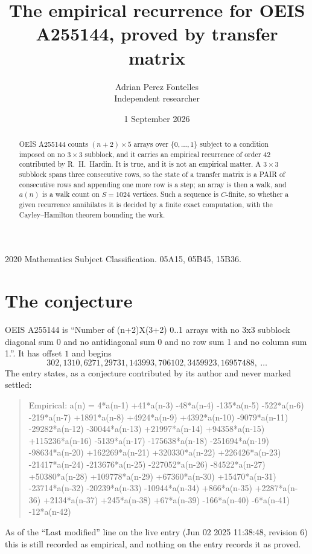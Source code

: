 \documentclass[11pt,a4paper]{article}
\title{The empirical recurrence for OEIS A255144, proved by transfer matrix}
\author{Adrian Perez Fontelles\\ \small Independent researcher}
\date{1 September 2026}
\theoremstyle{plain}
\theoremstyle{definition}
\begin{document}
\maketitle

\begin{abstract}
OEIS A255144 counts $(n+2)\times5$ arrays over $\{0,\dots,1\}$ subject to a condition imposed on
no $3\times3$ subblock, and it carries an empirical recurrence of order $42$
contributed by R.~H.~Hardin. It is true, and it is not an empirical matter. A $3\times3$
subblock spans three consecutive rows, so the state of a transfer matrix is a PAIR of
consecutive rows and appending one more row is a step; an array is then a walk, and
$a(n)$ is a walk count on $S=1024$ vertices. Such a sequence is $C$-finite, so whether a given
recurrence annihilates it is decided by a finite exact computation, with the Cayley--Hamilton
theorem bounding the work.
\end{abstract}

\noindent\small 2020 Mathematics Subject Classification. 05A15, 05B45, 15B36.\normalsize

\section{The conjecture}

OEIS A255144 is ``Number of (n+2)X(3+2) 0..1 arrays with no 3x3 subblock diagonal sum 0 and no antidiagonal sum 0 and no row sum 1 and no column sum 1.''. It has offset $1$ and begins
\[
302, 1310, 6271, 29731, 143993, 706102, 3459923, 16957488,\ \dots
\]
The entry states, as a conjecture contributed by its author and never marked settled:
\begin{quote}
Empirical: a(n) = 4*a(n-1) +41*a(n-3) -48*a(n-4) -135*a(n-5) -522*a(n-6) -219*a(n-7) +1891*a(n-8) +4924*a(n-9) +4392*a(n-10) -9079*a(n-11) -29282*a(n-12) -30044*a(n-13) +21997*a(n-14) +94358*a(n-15) +115236*a(n-16) -5139*a(n-17) -175638*a(n-18) -251694*a(n-19) -98634*a(n-20) +162269*a(n-21) +320330*a(n-22) +226426*a(n-23) -21417*a(n-24) -213676*a(n-25) -227052*a(n-26) -84522*a(n-27) +50380*a(n-28) +109778*a(n-29) +67360*a(n-30) +15470*a(n-31) -23714*a(n-32) -20239*a(n-33) -10944*a(n-34) +866*a(n-35) +2287*a(n-36) +2134*a(n-37) +245*a(n-38) +67*a(n-39) -166*a(n-40) -6*a(n-41) -12*a(n-42)
\end{quote}
As of the ``Last modified'' line on the live entry (Jun 02 2025 11:38:48, revision 6) this is still
recorded as empirical, and nothing on the entry records it as proved.
\end{document}
